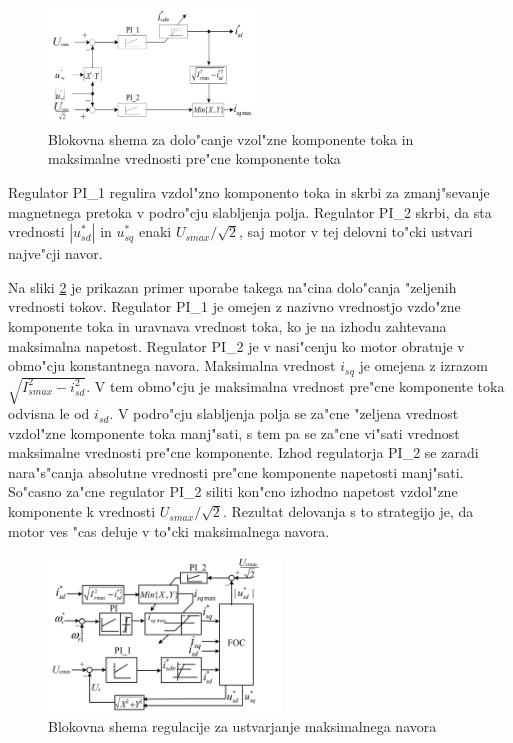 \documentclass[journal,a4paper,twoside]{sty/IEEEtran}
\begin{document}
\begin{figure}
\includegraphics[width=0.5\textwidth]{MTPA_prva.png}
\caption{Blokovna shema za dolo"canje vzol"zne komponente toka in maksimalne vrednosti pre"cne komponente toka\cite{MTPA}}
\label{fig:MTPA_strategy}
\end{figure}

Regulator PI\_1 regulira vzdol"zno komponento toka in skrbi za zmanj"sevanje magnetnega pretoka v podro"cju slabljenja polja. Regulator PI\_2 skrbi, da sta vrednosti $|u_{sd}^*|$ in $u_{sq}^*$ enaki $U_{smax}/\sqrt{2}$, saj motor v tej delovni to"cki ustvari najve"cji navor.

Na sliki \ref{fig:MTPA_app} je prikazan primer uporabe takega na"cina dolo"canja "zeljenih vrednosti tokov. Regulator PI\_1 je omejen z nazivno vrednostjo vzdo"zne komponente toka in uravnava vrednost toka, ko je na izhodu zahtevana maksimalna napetost. Regulator PI\_2 je v nasi"cenju ko motor obratuje v obmo"cju konstantnega navora. Maksimalna vrednost $i_{sq}$ je omejena z izrazom $\sqrt{I_{smax}^2-i_{sd}^2}$. V tem obmo"cju je maksimalna vrednost pre"cne komponente toka odvisna le od $i_{sd}$. V podro"cju slabljenja polja se za"cne "zeljena vrednost vzdol"zne komponente toka manj"sati, s tem pa se za"cne vi"sati vrednost maksimalne vrednosti pre"cne komponente. Izhod regulatorja PI\_2 se zaradi nara"s"canja absolutne vrednosti pre"cne komponente napetosti manj"sati. So"casno za"cne regulator PI\_2 siliti kon"cno izhodno napetost vzdol"zne komponente k vrednosti $U_{smax}/\sqrt{2}$. Rezultat delovanja s to strategijo je, da motor ves "cas deluje v to"cki maksimalnega navora.~\cite{MTPA}



\begin{figure}
\includegraphics[width=0.55\textwidth]{MTPA.png}

\caption{Blokovna shema regulacije za ustvarjanje maksimalnega navora\cite{MTPA}}
\label{fig:MTPA_app}
\end{figure}
\end{document}
